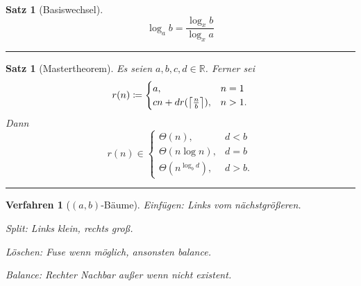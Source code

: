 \documentclass[a4paper]{article}
\newcounter{Sec}
\theoremstyle{marginbreak}
\newtheorem{satz}[definition]{Satz}
\newtheorem{verfahren}[definition]{Verfahren}
\newcommand{\sep}{%
	\rule{\textwidth}{0.3pt}%
	\stepcounter{Sec}%
	}
\DeclarePairedDelimiter\ceil{\lceil}{\rceil}
\begin{document}
	\begin{satz}[Basiswechsel]
		\[
			\log_a b = \frac{\log_x b}{\log_x a}
		\]
	\end{satz}

	\sep

	\begin{satz}[Mastertheorem]
		Es seien $a, b, c, d \in\mathbb{R}$. Ferner sei
		\[
			r(n)\coloneqq
			\begin{cases}
				a, &n=1\\
				cn+dr(\ceil*{\frac{n}{b}}), &n>1.
			\end{cases}
		\]
		Dann
		\[
			r(n)\in
			\begin{cases}
				\Theta(n), &d<b\\
				\Theta(n\log n), &d=b\\
				\Theta(n^{\log_b d}), &d>b.
			\end{cases}
		\]
	\end{satz}

	\sep

	\begin{verfahren}[$(a,b)$-Bäume]
		Einfügen: Links vom nächstgrößeren.

		Split: Links klein, rechts groß.

		Löschen: Fuse wenn möglich, ansonsten balance.

		Balance: Rechter Nachbar außer wenn nicht existent.
	\end{verfahren}
\end{document}
